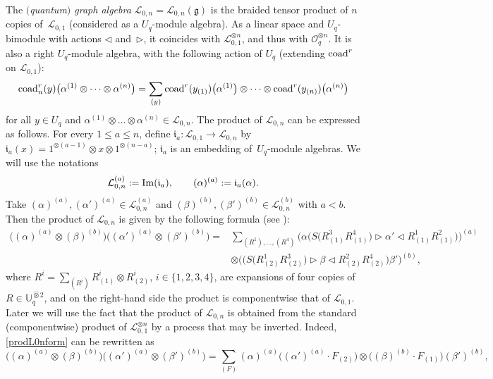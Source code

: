 \documentclass[pdftex]{sigma}
\numberwithin{equation}{section}
\theoremstyle{definition}
\newcommand{\mUq}{\mathbb{U}_q}
\newcommand{\Ll}{{\mathcal L}}
\newcommand{\Oo}{{\mathcal O}}
\newcommand{\ra}{\rightarrow}
\begin{document}
The {\it $($quantum$)$ graph algebra} $\Ll_{0,n} = \Ll_{0,n}(\mathfrak{g})$ is the braided tensor product of $n$ copies of~$\Ll_{0,1}$ (considered as a $U_q$-module algebra). As a linear space and $U_q$-bimodule with actions $\lhd$ and~$\rhd$, it coincides with $\Ll_{0,1}^{\otimes n}$, and thus with $\Oo_q^{\otimes n}$. It is also a right $U_q$-module algebra, with the following action of $U_q$ (extending ${\rm coad}^r$ on $\Ll_{0,1}$):
 \begin{gather}
{\rm coad}_n^r(y)\big(\alpha^{(1)}\otimes \dots \otimes \alpha^{(n)}\big) =
\sum_{(y)} {\rm coad}^r(y_{(1)})\big(\alpha^{(1)}\big) \otimes \dots \otimes {\rm coad}^r(y_{(n)})\big(\alpha^{(n)}\big)\label{actionprod}
\end{gather}
for all $y \in U_q$ and $\alpha^{(1)}\otimes \dots \otimes \alpha^{(n)} \in \Ll_{0,n}$. The product of $\Ll_{0,n}$ can be expressed as follows. For every $1\leq a\leq n$, define $\mathfrak{i}_a\colon \Ll_{0,1}\ra \Ll_{0,n}$ by $\mathfrak{i}_a(x) = 1^{\otimes (a-1)}\otimes x \otimes 1^{\otimes (n-a)}$; $\mathfrak{i}_a$ is an embedding of~$U_q$-module algebras. We will use the notations
\begin{equation}\label{plgtL01a}
\Ll_{0,n}^{(a)}:= {\rm Im}(\mathfrak{i}_a),\qquad (\alpha)^{(a)} := \mathfrak{i}_a(\alpha).
\end{equation}
Take $(\alpha)^{(a)},(\alpha')^{(a)} \in \Ll_{0,n}^{(a)}$ and $(\beta)^{(b)},(\beta')^{(b)} \in \Ll_{0,n}^{(b)}$ with $a<b$. Then the product of $\Ll_{0,n}$ is given by the following formula (see \cite[Section 6]{BR}):
\begin{align}
\big((\alpha)^{(a)}\otimes (\beta)^{(b)}\big) \big((\alpha')^{(a)} \otimes (\beta')^{(b)}\big) ={}& \sum_{(R^1),\dots, (R^4)} \big(\alpha \big(S\big(R^3_{(1)}R^4_{(1)}\big)\rhd \alpha' \lhd R^1_{(1)}R^2_{(1)}\big)\big)^{(a)}\nonumber\\
 &
\otimes \big( \big( S\big(R^1_{(2)}R^3_{(2)}\big) \rhd \beta \lhd R^2_{(2)}R^4_{(2)}\big)\beta'\big)^{(b)},\label{prodL0nform}
\end{align}
where $R^i = \sum_{(R^i)}R_{(1)}^i\otimes R_{(2)}^i$, $i\in \{1,2,3,4\}$, are expansions of four copies of $R\in \mUq^{\hat \otimes 2}$, and on the right-hand side the product is componentwise that of $\Ll_{0,1}$. Later we will use the fact that the product of $\Ll_{0,n}$ is obtained from the standard (componentwise) product of $\Ll_{0,1}^{\otimes n}$ by a process that may be inverted. Indeed, \eqref{prodL0nform} can be rewritten as
\begin{equation}\label{prodL0nform2}
\big((\alpha)^{(a)}\otimes (\beta)^{(b)}\big) \big((\alpha')^{(a)} \otimes (\beta')^{(b)}\big) = \sum_{(F)} (\alpha)^{(a)}\big((\alpha')^{(a)}\cdot F_{(2)}\big)\otimes \big((\beta)^{(b)}\cdot F_{(1)}\big)(\beta')^{(b)},
\end{equation}
\end{document}
